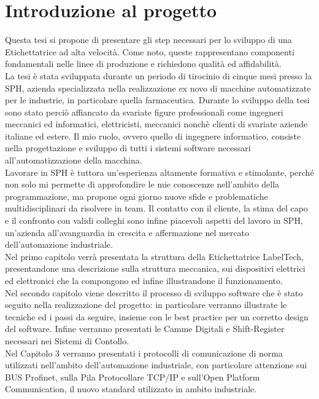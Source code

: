 \documentclass[12pt, a4paper, oneside]{book}
\begin{document}
\section*{Introduzione al progetto}
Questa tesi si propone di presentare gli step necessari per lo sviluppo di una Etichettatrice ad alta velocità. Come noto, queste rappresentano componenti fondamentali nelle linee di produzione e richiedono qualità ed affidabilità. 
\\La tesi è stata sviluppata durante un periodo di tirocinio di cinque mesi presso la SPH, azienda specializzata nella realizzazione ex novo di macchine automatizzate per le industrie, in particolare quella farmaceutica. Durante lo sviluppo della tesi sono stato perciò affiancato da svariate figure professionali come ingegneri meccanici ed informatici, elettricisti, meccanici nonchè clienti di svariate aziende italiane ed estere. Il mio ruolo, ovvero quello di ingegnere informatico,  consiste nella progettazione e sviluppo di tutti i sistemi software necessari all'automatizzazione della macchina. 
\\Lavorare in SPH è tuttora un'esperienza altamente formativa e stimolante, perché non solo mi permette di approfondire le mie conoscenze nell'ambito della programmazione, ma propone ogni giorno nuove sfide e problematiche multidisciplinari da risolvere in team. Il contatto con il cliente, la stima del capo e il confronto con validi colleghi sono infine piacevoli aspetti del lavoro in SPH, un'azienda all'avanguardia in crescita e affermazione nel mercato dell'automazione industriale.   
\\Nel primo capitolo verrà presentata la struttura della Etichettatrice LabelTech, presentandone una descrizione sulla struttura meccanica, sui dispositivi elettrici ed elettronici che la compongono ed infine illustrandone il funzionamento.
\\Nel secondo capitolo viene descritto il processo di sviluppo software che è stato seguito nella realizzazione del progetto: in particolare verranno illustrate le tecniche ed i passi da seguire, insieme con le best practice per un corretto design del software. Infine verranno presentati le Camme Digitali e Shift-Register necessari nei Sistemi di Contollo.
\\Nel Capitolo 3 verranno presentati i protocolli di comunicazione di norma utilizzati nell'ambito dell'automazione industriale, con particolare attenzione sui BUS Profinet, sulla Pila Protocollare TCP/IP e sull'Open Platform Communication, il nuovo standard utilizzato in ambito industriale.
\end{document}
